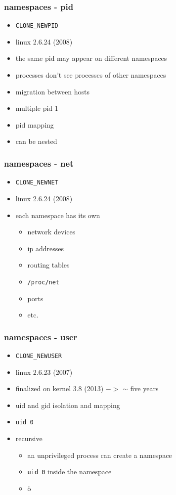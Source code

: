 \documentclass{beamer}
\begin{document}
\begin{frame}
    \frametitle{namespaces - pid}
    \begin{itemize}
        \item \texttt{CLONE\_NEWPID}
        \item linux 2.6.24 (2008)
        \item the same pid may appear on different namespaces
        \item processes don't see processes of other namespaces
        \item migration between hosts
        \item multiple pid 1
        \item pid mapping
        \item can be nested
    \end{itemize}
\end{frame}

\begin{frame}
    \frametitle{namespaces - net}
    \begin{itemize}
        \item \texttt{CLONE\_NEWNET}
        \item linux 2.6.24 (2008)
        \item each namespace has its own
            \begin{itemize}
                \item network devices
                \item ip addresses
                \item routing tables
                \item \texttt{/proc/net}
                \item ports
                \item etc.
            \end{itemize}
    \end{itemize}
\end{frame}

\begin{frame}
    \frametitle{namespaces - user}
    \begin{itemize}
        \item \texttt{CLONE\_NEWUSER}
        \item linux 2.6.23 (2007)
        \item finalized on kernel 3.8 (2013) $->$ $\sim$ five years
        \item uid and gid isolation and mapping
        \item \texttt{uid 0}
        \item recursive
        \begin{itemize}
            \item an unprivileged process can create a namespace
            \item \texttt{uid 0} inside the namespace
            \item<2> ö
        \end{itemize}
    \end{itemize}
\end{frame}
\end{document}
